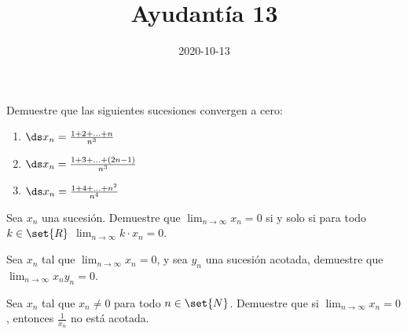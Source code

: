 \documentclass{ayudantia}
\title{Ayudantía 13}
\date{2020-10-13}
\begin{document}
\maketitle


\begin{prob}
    Demuestre que las siguientes sucesiones convergen a cero:
    \begin{enumerate}
        \item \(\ds x_n=\frac{1+2+\ldots+n}{n^3}\)
        \item \(\ds x_n=\frac{1+3+\ldots+(2n-1)}{n^3}\)
        \item \(\ds x_n=\frac{1+4+\ldots+n^2}{n^4}\)
    \end{enumerate}
\end{prob}

\begin{ans}
    \begin{sol}

    \end{sol}
\end{ans}



\begin{prob}
    Sea \(x_n\) una sucesión. Demuestre que \(\lim_{n\rightarrow\infty}x_n=0\) si y solo si para todo \(k\in\set{R}\) \(\lim_{n\rightarrow\infty}k\cdot x_n=0\).
\end{prob}

\begin{ans}
    \begin{sol}

    \end{sol}
\end{ans}



\begin{prob}
    Sea \(x_n\) tal que \(\lim_{n\rightarrow\infty}x_n=0\), y sea \(y_n\) una sucesión acotada, demuestre que \(\lim_{n\rightarrow\infty}x_ny_n=0\).
\end{prob}

\begin{ans}
    \begin{sol}

    \end{sol}
\end{ans}



\begin{prob}
    Sea \(x_n\) tal que \(x_n\neq0\) para todo \(n\in\set{N}\). Demuestre que si \(\lim_{n\rightarrow\infty}x_n=0\), entonces \(\frac1{x_n}\) no está acotada.
\end{prob}

\begin{ans}
    \begin{sol}

    \end{sol}
\end{ans}
\end{document}
